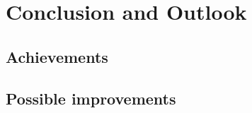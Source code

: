 \section{Conclusion and Outlook}
\label{sec:conclusion}
\subsection{Achievements}
\subsection{Possible improvements}